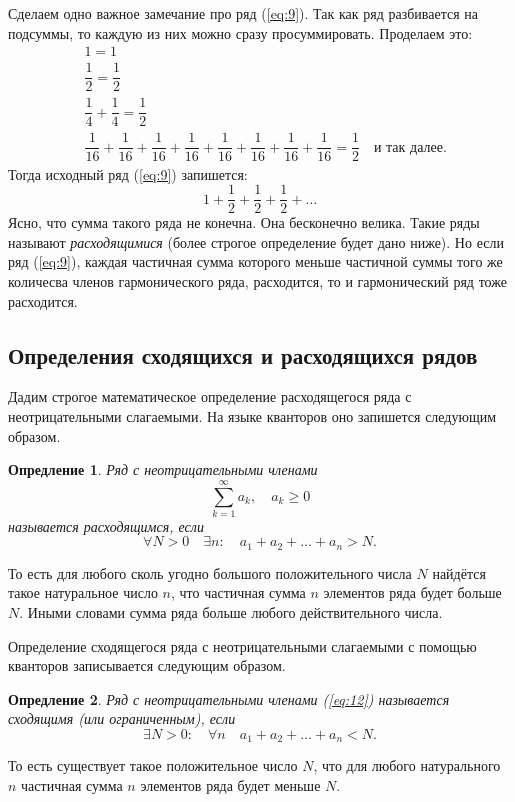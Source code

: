 \documentclass[12pt]{article}
\newtheorem{definition}{Опредление}[section]
\begin{document}
\par
Сделаем одно важное замечание про ряд (\ref{eq:9}). Так как ряд разбивается на подсуммы, то каждую из них можно сразу просуммировать. Проделаем это:
\begin{equation}
    \begin{split}
        &1 = 1\\
        &\dfrac{1}{2} = \dfrac{1}{2}\\
        &\dfrac{1}{4} + \dfrac{1}{4} = \dfrac{1}{2}\\
        &\dfrac1{16}+ \dfrac1{16}+ \dfrac1{16}+ \dfrac1{16} + \dfrac1{16}+ \dfrac1{16}+ \dfrac1{16}+ \dfrac1{16} = \dfrac{1}{2} \quad \text{и так далее.}
    \end{split}
\end{equation}
Тогда исходный ряд (\ref{eq:9}) запишется:
\begin{equation}
    1 + \dfrac12 + \dfrac12 + \dfrac12 + \ldots
\end{equation}
Ясно, что сумма такого ряда не конечна. Она бесконечно велика. Такие ряды называют \emph{расходящимися} (более строгое определение будет дано ниже). Но если ряд (\ref{eq:9}), каждая частичная сумма которого меньше частичной суммы того же количесва членов гармонического ряда, расходится, то и гармонический ряд тоже расходится.
\subsection{Определения сходящихся и расходящихся рядов}
Дадим строгое математическое определение расходящегося ряда с неотрицательными слагаемыми. На языке кванторов оно запишется следующим образом.
\begin{definition}
Ряд с неотрицательными членами 
\begin{equation}\label{eq:12}
    \sum_{k=1}^\infty a_k, \quad a_k \ge 0
\end{equation}
называется расходящимся, если
\begin{equation}
    \forall N > 0 \quad \exists n: \quad a_1 + a_2 + \ldots + a_n > N.
\end{equation}
\end{definition}
То есть для любого сколь угодно большого положительного числа $N$ найдётся такое натуральное число $n$, что частичная сумма $n$ элементов ряда будет больше $N$. Иными словами сумма ряда больше любого действительного числа.
\par
Определение {сходящегося ряда с неотрицательными слагаемыми} с помощью кванторов записывается следующим образом.
\begin{definition}
Ряд с неотрицательными членами (\ref{eq:12}) называется сходящимя (или ограниченным), если 
\begin{equation}
    \exists N > 0: \quad \forall n \quad a_1 + a_2 + \ldots + a_n < N.
\end{equation}
\end{definition}
То есть существует такое положительное число $N$, что для любого натурального $n$ частичная сумма $n$ элементов ряда будет меньше $N$.
\end{document}
